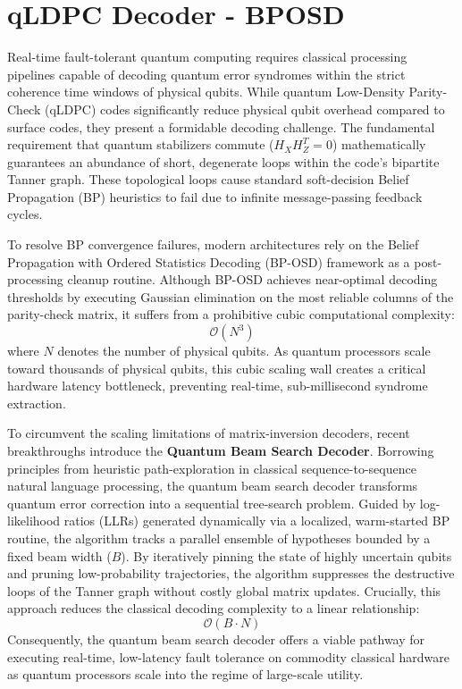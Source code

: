 \section{qLDPC Decoder - BPOSD}
Real-time fault-tolerant quantum computing requires classical processing pipelines capable of decoding quantum error syndromes within the strict coherence time windows of physical qubits. While quantum Low-Density Parity-Check (qLDPC) codes significantly reduce physical qubit overhead compared to surface codes, they present a formidable decoding challenge. The fundamental requirement that quantum stabilizers commute ($H_X H_Z^T = 0$) mathematically guarantees an abundance of short, degenerate loops within the code's bipartite Tanner graph. These topological loops cause standard soft-decision Belief Propagation (BP) heuristics to fail due to infinite message-passing feedback cycles.

To resolve BP convergence failures, modern architectures rely on the Belief Propagation with Ordered Statistics Decoding (BP-OSD) framework as a post-processing cleanup routine. Although BP-OSD achieves near-optimal decoding thresholds by executing Gaussian elimination on the most reliable columns of the parity-check matrix, it suffers from a prohibitive cubic computational complexity:
\begin{equation}
    \mathcal{O}(N^3)
\end{equation}
where $N$ denotes the number of physical qubits. As quantum processors scale toward thousands of physical qubits, this cubic scaling wall creates a critical hardware latency bottleneck, preventing real-time, sub-millisecond syndrome extraction.

To circumvent the scaling limitations of matrix-inversion decoders, recent breakthroughs introduce the \textbf{Quantum Beam Search Decoder}. Borrowing principles from heuristic path-exploration in classical sequence-to-sequence natural language processing, the quantum beam search decoder transforms quantum error correction into a sequential tree-search problem. Guided by log-likelihood ratios (LLRs) generated dynamically via a localized, warm-started BP routine, the algorithm tracks a parallel ensemble of hypotheses bounded by a fixed beam width ($B$). By iteratively pinning the state of highly uncertain qubits and pruning low-probability trajectories, the algorithm suppresses the destructive loops of the Tanner graph without costly global matrix updates. Crucially, this approach reduces the classical decoding complexity to a linear relationship:
\begin{equation}
    \mathcal{O}(B \cdot N)
\end{equation}
Consequently, the quantum beam search decoder offers a viable pathway for executing real-time, low-latency fault tolerance on commodity classical hardware as quantum processors scale into the regime of large-scale utility.
